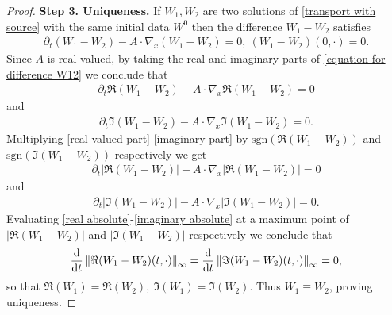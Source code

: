 \documentclass[11pt,reqno]{amsart}
\numberwithin{equation}{section}
\def\dd{{\rm d}}
\begin{document}
\begin{proof}
\textbf{Step 3. Uniqueness.} If $W_{1},W_{2}$ are two solutions of \eqref{transport with source} with the same initial data $W^{0}$ then the difference $W_{1}-W_{2}$ satisfies  \begin{align}
\partial_{t}(W_
{1}-W_{2})-A\cdot \nabla_{x}(W_{1}-W_{2})=0, \ (W_{1}-W_{2})(0,\cdot)=0. \label{equation for difference W12}    
\end{align}
Since $A$ is real valued, by taking the real and imaginary parts of  \eqref{equation for difference W12} we conclude that 
\begin{align}
\partial_{t}\Re(W_{1}-W_{2})-A\cdot \nabla_{x}\Re(W_{1}-W_{2})=0 \label{real valued part} 
\end{align}
and 
\begin{align}
\partial_{t}\Im(W_{1}-W_{2})-A\cdot  \nabla_{x}\Im(W_{1}-W_{2})=0.\label{imaginary part}     
\end{align}
Multiplying \eqref{real valued part}-\eqref{imaginary part} by $\mathrm{sgn}(\Re(W_{1}-W_{2}))$ and $\mathrm{sgn}(\Im(W_{1}-W_{2}))$ respectively we get 
\begin{align}
\partial_{t}\left\vert \Re(W_{1}-W_{2})\right\vert -A\cdot \nabla_{x}\left\vert \Re(W_{1}-W_{2})  \right\vert=0 
\label{real absolute}
\end{align}
and 
\begin{align}
\partial_{t}\left\vert \Im(W_{1}-W_{2})\right\vert-A\cdot \nabla_{x}\left\vert \Im(W_{1}-W_{2})\right\vert=0. \label{imaginary absolute}      
\end{align}
Evaluating \eqref{real absolute}-\eqref{imaginary absolute} at a maximum point of $\left\vert \Re(W_{1}-W_{2})\right\vert$ and $\left\vert \Im(W_{1}-W_{2})\right\vert$ respectively we conclude that 
\begin{align*}
\frac{\dd}{\dd t}\left\Vert \Re(W_{1}-W_{2})(t,\cdot)\right\Vert_{\infty}=\frac{\dd}{\dd t}\left\Vert \Im(W_{1}-W_{2})(t,\cdot)\right\Vert_{\infty}=0,     
\end{align*}
so that $\Re(W_{1})=\Re(W_{2}), \ \Im(W_{1})=\Im(W_{2})$. Thus $W_{1}\equiv W_{2}$, proving uniqueness. 
\end{proof}
\end{document}
